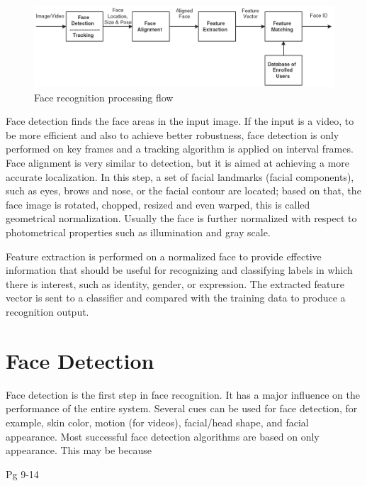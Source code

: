 \documentclass[12pt, twoside]{report}
\begin{document}
\begin{figure}[h]
    \centering
    \includegraphics[width=\textwidth]{img/processingFlow.png}
    \caption{Face recognition processing flow}
    \label{fig:processingFlow}
\end{figure}

Face detection finds the face areas in the input image. If the input is a video, to be more efficient and also to achieve better robustness, face detection is only performed on key frames and a tracking algorithm is applied on interval frames. Face alignment is very similar to detection, but it is aimed at achieving a more accurate localization. In this step, a set of facial landmarks (facial components), such as eyes, brows and nose, or the facial contour are located; based on that, the face image is rotated, chopped, resized and even warped, this is called geometrical normalization. Usually the face is further normalized with respect to photometrical properties such as illumination and gray scale.

Feature extraction is performed on a normalized face to provide effective information that should be useful for recognizing and classifying labels in which there is interest, such as identity, gender, or expression. The extracted feature vector is sent to a classifier and compared with the training data to produce a recognition output.

\section{Face Detection}
Face detection is the first step in face recognition. It has a major influence on the performance of the entire system. Several cues can be used for face detection, for example, skin color, motion (for videos), facial/head shape, and facial appearance. Most successful face detection algorithms are based on only appearance. This may be because 

Pg 9-14
\end{document}
